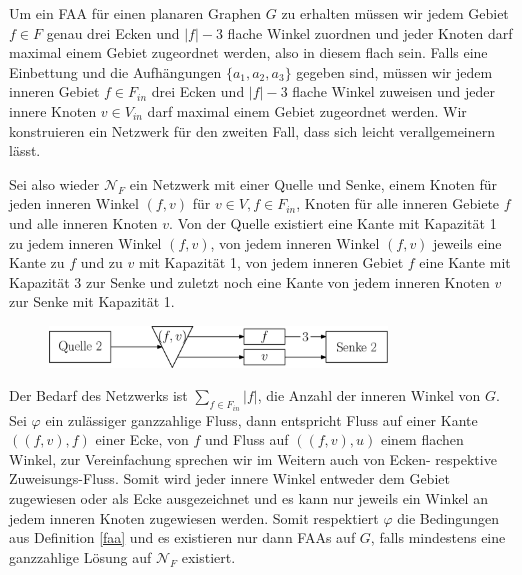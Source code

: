 Um ein FAA für einen planaren Graphen $G$ zu erhalten müssen wir jedem Gebiet $f \in F$ genau drei Ecken und $|f|-3$ flache Winkel zuordnen und jeder Knoten darf maximal einem Gebiet zugeordnet werden, also in diesem flach sein. Falls eine Einbettung und die Aufhängungen $\{a_1,a_2,a_3\}$ gegeben sind, müssen wir jedem inneren Gebiet $f \in F_{in}$ drei Ecken und $|f|-3$ flache Winkel zuweisen und jeder innere Knoten $v \in V_{in}$ darf maximal einem Gebiet zugeordnet werden. Wir konstruieren ein Netzwerk für den zweiten Fall, dass sich leicht verallgemeinern lässt.\

Sei also wieder $\mathcal{N}_F$ ein Netzwerk mit einer Quelle und Senke, einem Knoten für jeden inneren Winkel $(f,v)$ für $v\in V, f \in F_{in}$, Knoten für alle inneren Gebiete $f$ und alle inneren Knoten $v$. Von der Quelle existiert eine Kante mit Kapazität 1 zu jedem inneren Winkel $(f,v)$, von jedem inneren Winkel $(f,v)$ jeweils eine Kante zu $f$ und zu $v$ mit Kapazität 1, von jedem inneren Gebiet $f$ eine Kante mit Kapazität 3 zur Senke und zuletzt noch eine Kante von jedem inneren Knoten $v$ zur Senke mit Kapazität 1.

\begin{figure}[h]
	\centering
  \includegraphics[width=0.8\textwidth]{faa_flow.png}
\end{figure}


Der Bedarf des Netzwerks ist $\sum_{f \in F_{in}}{|f|}$, die Anzahl der inneren Winkel von $G$. Sei $\varphi$ ein zulässiger ganzzahlige Fluss, dann entspricht Fluss auf einer Kante $((f,v),f)$ einer Ecke, von $f$ und Fluss auf $((f,v),u)$ einem flachen Winkel, zur Vereinfachung sprechen wir im Weitern auch von Ecken- respektive Zuweisungs-Fluss. Somit wird jeder innere Winkel entweder dem Gebiet zugewiesen oder als Ecke ausgezeichnet und es kann nur jeweils ein Winkel an jedem inneren Knoten zugewiesen werden. Somit respektiert $\varphi$ die Bedingungen aus Definition \ref{faa} und es existieren nur dann FAAs auf $G$, falls mindestens eine ganzzahlige Lösung auf $\mathcal{N}_F$ existiert.

